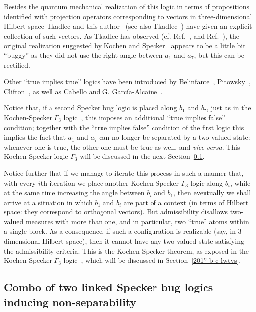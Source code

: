 \documentclass[%
  twocolumn,
 showpacs,
 showkeys,
 preprintnumbers,
 amsmath,amssymb,
 aps,
  pra,
  longbibliography,
 floatfix,
 ]{revtex4-1}
\begin{document}
Besides the  quantum mechanical realization of this logic in terms of propositions identified with projection operators
corresponding to vectors in three-dimensional Hilbert space
Tkadlec and this author~\cite[p.~5387, Fig.~4]{svozil-tkadlec}
(see also Tkadlec~\cite[p.~206, Fig.~1]{tkadlec-96}) have given  an explicit collection of such vectors.
As Tkadlec has observed (cf. Ref.~\cite[p.~5390]{svozil-tkadlec}, and Ref.~\cite[p.]{tkadlec-01}),
the original realization suggested by Kochen and Specker~\cite{kochen1} appears to be a little bit ``buggy''
as they did not use the right angle between $a_1$ and $a_7$, but this can be rectified.

Other ``true implies true'' logics have been introduced by Belinfante~\cite[Fig.~C.l. p.~67]{Belinfante-73},
Pitowsky~\cite[p.~394]{Pitowsky-1982-subs},
Clifton~\cite{clifton-93,Johansen-1994,Vermaas-1994},
as well as Cabello and G. Garc{\'{i}}a-Alcaine~\cite[Lemma~1]{Cabello-1996-bks-fd}.

Notice that, if a second Specker bug logic is placed along $b_1$ and $b_7$,
just as in the Kochen-Specker $\Gamma_3$ logic~\cite[p.~70]{kochen1},
this imposes an additional ``true implies false'' condition; together with the
 ``true implies false'' condition of the first logic this
implies the fact that $a_1$ and $a_7$ can no longer be separated by a two-valued state: whenever one is true,
the other one must be true as well, and {\em vice versa}.
This Kochen-Specker logic $\Gamma_3$ will be discussed in the next Section~\ref{2017-b-bugscombino}.

Notice further that if we manage to iterate this process in such a manner that,
with every $i$th iteration we place another Kochen-Specker $\Gamma_3$ logic  along $b_i$,
while at the same time increasing the angle between $b_i$ and $b_1$,
then eventually we shall arrive at a situation in which $b_1$ and $b_i$ are part of a context
(in terms of Hilbert space: they correspond to orthogonal vectors).
But admissibility disallows two-valued measures with more than one, and in particular,
two ``true'' atoms within a single block. As a consequence, if such a configuration is
realizable (say, in 3-dimensional Hilbert space), then it cannot have any two-valued state
satisfying the admissibility criteria.
This is the Kochen-Specker theorem, as exposed in the  Kochen-Specker $\Gamma_3$ logic~\cite[p.~69]{kochen1},
which will be discussed in Section~\ref{2017-b-c-lwtvs}.


\subsection{Combo of two linked Specker bug logics inducing non-separability}
\label{2017-b-bugscombino}
\end{document}
